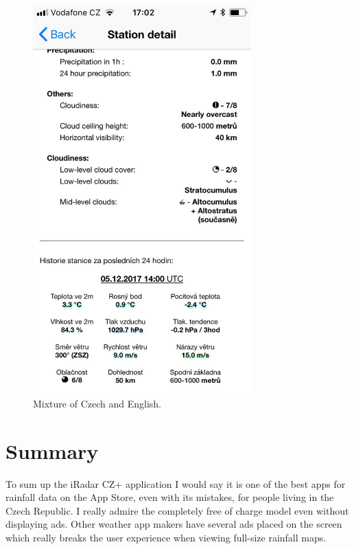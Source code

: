 \documentclass[11pt,a4paper]{article}
\begin{document}
\begin{figure}[htb]
\begin{minipage}[b]{0.49\textwidth}
        \includegraphics[width=0.75\textwidth]{czenglish}
        \caption{Mixture of Czech and English.}
        \label{fig:czeng}
    \end{minipage}


\end{figure}

\section{Summary}

To sum up the iRadar CZ+ application I would say it is one of the best apps for rainfall data on the App Store, even with its mistakes, for people living in the Czech Republic. I really admire the completely free of charge model even without displaying ads. Other weather app makers have several ads placed on the screen which really breaks the user experience when viewing full-size rainfall maps.

{}

\end{document}
